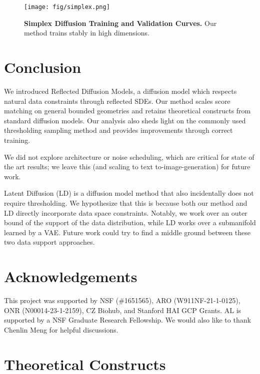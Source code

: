 \documentclass{article}
\theoremstyle{plain}
\theoremstyle{definition}
\theoremstyle{remark}
\begin{document}
\begin{figure}[t]
    \centering
    \texttt{[image: fig/simplex.png]}
    \caption{\textbf{Simplex Diffusion Training and Validation Curves.} Our method trains stably in high dimensions.}
    \label{fig:simplexresults}
    \vspace{-5mm}
\end{figure}








%
 \section{Conclusion}

We introduced Reflected Diffusion Models, a diffusion model which respects natural data constraints through reflected SDEs. Our method scales score matching on general bounded geometries and retains theoretical constructs from standard diffusion models. Our analysis also sheds light on the commonly used thresholding sampling method and provides improvements through correct training.

We did not explore architecture or noise scheduling, which are critical for state of the art results; we leave this (and scaling to text to-image-generation) for future work.

Latent Diffusion (LD) \citep{Rombach2021HighResolutionIS} is a diffusion model method that also incidentally does not require thresholding. We hypothesize that this is because both our method and LD directly incorporate data space constraints. Notably, we work over an outer bound of the support of the data distribution, while LD works over a submanifold learned by a VAE. Future work could try to find a middle ground between these two data support approaches. \section{Acknowledgements}

This project was supported by NSF (\#1651565), ARO (W911NF-21-1-0125), ONR (N00014-23-1-2159), CZ Biohub, and Stanford HAI GCP Grants. AL is supported by a NSF Graduate Research Fellowship. We would also like to thank Chenlin Meng for helpful discussions.
 




\newpage
\appendix
\onecolumn
\section{Theoretical Constructs}
\end{document}
